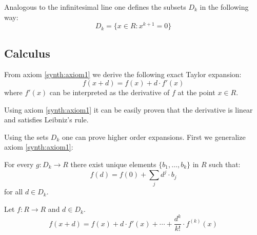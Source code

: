 	\begin{notation}
		Analogous to the infinitesimal line one defines the subsets $D_k$ in the following way:
		\begin{equation}
			D_k = \{x\in R: x^{k+1} = 0\}
		\end{equation}
	\end{notation}
	
\subsection{Calculus}

	\begin{formula}
		From axiom \ref{synth:axiom1} we derive the following exact Taylor expansion:
		\begin{equation}
			f(x+d) = f(x) + d\cdot f'(x)
		\end{equation}
		where $f'(x)$ can be interpreted as the derivative of $f$ at the point $x\in R$.
	\end{formula}
	\begin{property}
		Using axiom \ref{synth:axiom1} it can be easily proven that the derivative is linear and satisfies Leibniz's rule.
	\end{property}
	
	Using the sets $D_k$ one can prove higher order expansions. First we generalize axiom \ref{synth:axiom1}:
	\begin{axiom}\label{synth:axiom1b}
		For every $g:D_k\rightarrow R$ there exist unique elements $\{b_1, \hdots, b_k\}$ in $R$ such that:
		\begin{equation}
			f(d) = f(0) + \sum_jd^j\cdot b_j
		\end{equation}
		for all $d\in D_k$.
	\end{axiom}
	\begin{result}
		Let $f:R\rightarrow R$ and $d\in D_k$.
		\begin{equation}
			\boxed{f(x+d) = f(x) + d\cdot f'(x) + \cdots + \frac{d^k}{k!}\cdot f^{(k)}(x)}
		\end{equation}
	\end{result}

